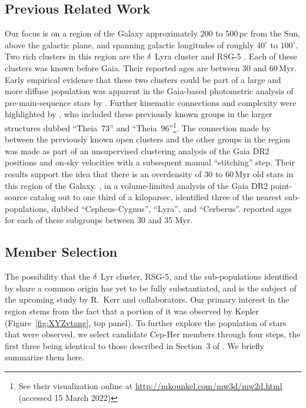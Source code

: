 \documentclass[12pt,twocolumn]{aastex63}
\begin{document}
\subsection{Previous Related Work}

Our focus is on a region of the Galaxy approximately 200 to 500\,pc
from the Sun, above the galactic plane, and spanning galactic
longitudes of roughly $40^\circ$ to $100^\circ$.  Two rich
clusters in this region are the $\delta$~Lyra cluster
\citep{stephenson_possible_1959} and RSG-5 \citep{roser_nine_2016}.
Each of these clusters was known before Gaia.  Their reported ages
are between 30 and 60\,Myr.  Early empirical
evidence that these two clusters could be part of a large and more
diffuse population was apparent in the Gaia-based photometric analysis
of pre-main-sequence stars by \citet[][see their Figures~11
and~13]{Zari2018}.  Further kinematic connections and complexity were
highlighted by \citet{KounkelCovey2019}, who included these previously
known groups in the larger structures dubbed ``Theia~73'' and
``Theia~96''\footnote{See their visualization online at
\url{http://mkounkel.com/mw3d/mw2d.html} (accessed 15 March 2022)}.
The connection made by \citet{KounkelCovey2019} between the previously
known open clusters and the other groups in the region was made as
part of an unsupervised clustering analysis of the Gaia DR2 positions
and on-sky velocities with a subsequent manual ``stitching'' step.
Their results support the idea that there is an overdensity of
30 to 60\,Myr old stars in this region of
the Galaxy.  \citet{Kerr2021}, in a volume-limited analysis of the
Gaia DR2 point-source catalog out to one third of a kiloparsec,
identified three of the nearest sub-populations, dubbed
``Cepheus-Cygnus'', ``Lyra'', and ``Cerberus''.  \citet{Kerr2021}
reported ages for each of these subgroups between 30 and 35 Myr.


\subsection{Member Selection}
\label{subsec:members}

The possibility that the $\delta$~Lyr cluster, RSG-5, and the
sub-populations identified by \citet{Kerr2021} share a common origin
has yet to be fully substantiated, and is the subject of the upcoming
study by R.~Kerr and collaborators.  Our primary interest in the
region stems from the fact that a portion of it was observed by Kepler
(Figure~\ref{fig:XYZvtang}, top panel).  To further explore the
population of stars that were observed, we select candidate Cep-Her
members through four steps, the first three being identical to those
described in Section~3 of \citet{Kerr2021}.  We briefly summarize them
here.
\end{document}
